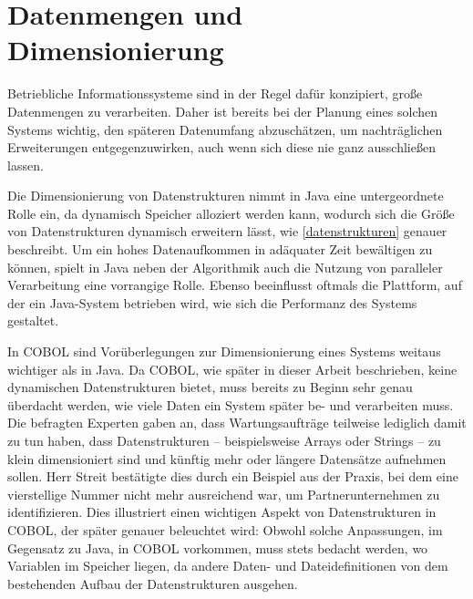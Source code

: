 \section{Datenmengen und Dimensionierung}

Betriebliche Informationssysteme sind in der Regel dafür konzipiert, große Datenmengen zu verarbeiten. Daher ist bereits bei der Planung eines solchen Systems wichtig, den späteren Datenumfang abzuschätzen, um nachträglichen Erweiterungen entgegenzuwirken, auch wenn sich diese nie ganz ausschließen lassen.

Die Dimensionierung von Datenstrukturen nimmt in Java eine untergeordnete Rolle ein, da dynamisch Speicher alloziert werden kann, wodurch sich die Größe von Datenstrukturen dynamisch erweitern lässt, wie \autoref{datenstrukturen} genauer beschreibt. Um ein hohes Datenaufkommen in adäquater Zeit bewältigen zu können, spielt in Java neben der Algorithmik auch die Nutzung von paralleler Verarbeitung eine vorrangige Rolle. Ebenso beeinflusst oftmals die Plattform, auf der ein Java-System betrieben wird, wie sich die Performanz des Systems gestaltet.

In COBOL sind Vorüberlegungen zur Dimensionierung eines Systems weitaus wichtiger als in Java. Da COBOL, wie später in dieser Arbeit beschrieben, keine dynamischen Datenstrukturen bietet, muss bereits zu Beginn sehr genau überdacht werden, wie viele Daten ein System später be- und verarbeiten muss. Die befragten Experten gaben an, dass  Wartungsaufträge teilweise lediglich damit zu tun haben, dass Datenstrukturen -- beispielsweise Arrays oder Strings -- zu klein dimensioniert sind und künftig mehr oder längere Datensätze aufnehmen sollen. Herr Streit bestätigte dies durch ein Beispiel aus der Praxis, bei dem eine vierstellige Nummer nicht mehr ausreichend war, um Partnerunternehmen zu identifizieren.  Dies illustriert einen wichtigen Aspekt von Datenstrukturen in COBOL, der später genauer beleuchtet wird: Obwohl solche Anpassungen, im Gegensatz zu Java, in COBOL vorkommen, muss stets bedacht werden, wo Variablen im Speicher liegen, da andere Daten- und Dateidefinitionen von dem bestehenden Aufbau der Datenstrukturen ausgehen.